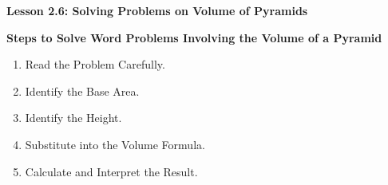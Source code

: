  \begin{center}
\textbf{Lesson 2.6: Solving Problems on Volume of Pyramids}
\end{center}

\vspace*{1ex}

\noindent\textbf{Steps to Solve Word Problems Involving the Volume of a Pyramid}
\begin{enumerate}[noitemsep, label = \color{blue}\arabic*. ]

    \item Read the Problem Carefully.
    
    \item Identify the Base Area.
    
    \item Identify the Height.
    
    \item Substitute into the Volume Formula.
    
    \item Calculate and Interpret the Result.
    
\end{enumerate}


